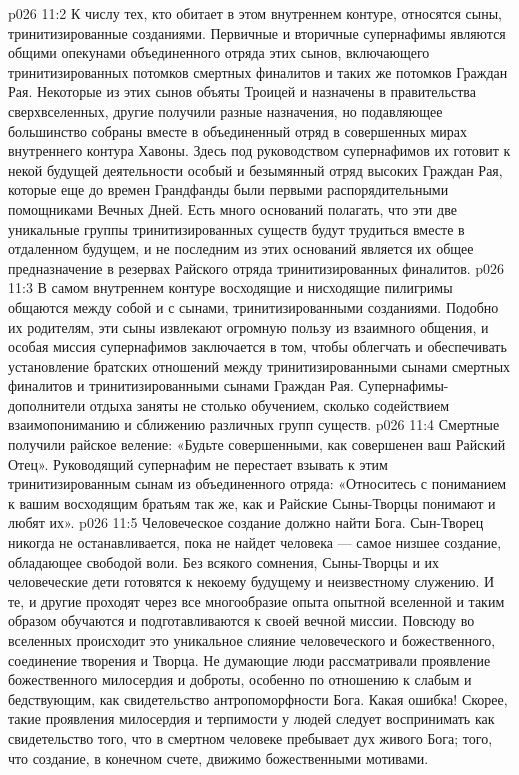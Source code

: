 \vs p026 11:2 \pc К числу тех, кто обитает в этом внутреннем контуре, относятся сыны, тринитизированные созданиями. Первичные и вторичные супернафимы являются общими опекунами объединенного отряда этих сынов, включающего тринитизированных потомков смертных финалитов и таких же потомков Граждан Рая. Некоторые из этих сынов объяты Троицей и назначены в правительства сверхвселенных, другие получили разные назначения, но подавляющее большинство собраны вместе в объединенный отряд в совершенных мирах внутреннего контура Хавоны. Здесь под руководством супернафимов их готовит к некой будущей деятельности особый и безымянный отряд высоких Граждан Рая, которые еще до времен Грандфанды были первыми распорядительными помощниками Вечных Дней. Есть много оснований полагать, что эти две уникальные группы тринитизированных существ будут трудиться вместе в отдаленном будущем, и не последним из этих оснований является их общее предназначение в резервах Райского отряда тринитизированных финалитов.
\vs p026 11:3 В самом внутреннем контуре восходящие и нисходящие пилигримы общаются между собой и с сынами, тринитизированными созданиями. Подобно их родителям, эти сыны извлекают огромную пользу из взаимного общения, и особая миссия супернафимов заключается в том, чтобы облегчать и обеспечивать установление братских отношений между тринитизированными сынами смертных финалитов и тринитизированными сынами Граждан Рая. Супернафимы\hyp{}дополнители отдыха заняты не столько обучением, сколько содействием взаимопониманию и сближению различных групп существ.
\vs p026 11:4 Смертные получили райское веление: «Будьте совершенными, как совершенен ваш Райский Отец». Руководящий супернафим не перестает взывать к этим тринитизированным сынам из объединенного отряда: «Относитесь с пониманием к вашим восходящим братьям так же, как и Райские Сыны\hyp{}Творцы понимают и любят их».
\vs p026 11:5 \pc Человеческое создание должно найти Бога. Сын\hyp{}Творец никогда не останавливается, пока не найдет человека --- самое низшее создание, обладающее свободой воли. Без всякого сомнения, Сыны\hyp{}Творцы и их человеческие дети готовятся к некоему будущему и неизвестному служению. И те, и другие проходят через все многообразие опыта опытной вселенной и таким образом обучаются и подготавливаются к своей вечной миссии. Повсюду во вселенных происходит это уникальное слияние человеческого и божественного, соединение творения и Творца. Не думающие люди рассматривали проявление божественного милосердия и доброты, особенно по отношению к слабым и бедствующим, как свидетельство антропоморфности Бога. Какая ошибка! Скорее, такие проявления милосердия и терпимости у людей следует воспринимать как свидетельство того, что в смертном человеке пребывает дух живого Бога; того, что создание, в конечном счете, движимо божественными мотивами.
